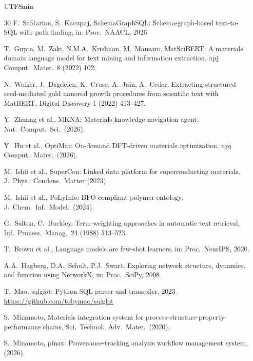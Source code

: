 \documentclass[sn-mathphys,Numbered]{sn-jnl}
\begin{document}
\begin{CJK}{UTF8}{min}
\begin{thebibliography}{30}
F.~Safdarian, S.~Kacupaj,
SchemaGraphSQL: Schema-graph-based text-to-SQL with path finding,
in: Proc.\ NAACL, 2026.

T.~Gupta, M.~Zaki, N.M.A.~Krishnan, M.~Mausam,
MatSciBERT: A materials domain language model for text mining and information extraction,
npj Comput.\ Mater.\ 8 (2022) 102.

N.~Walker, J.~Dagdelen, K.~Cruse, A.~Jain, A.~Ceder,
Extracting structured seed-mediated gold nanorod growth procedures from scientific text with MatBERT,
Digital Discovery 1 (2022) 413--427.

Y.~Zhuang et al.,
MKNA: Materials knowledge navigation agent,
Nat.\ Comput.\ Sci.\ (2026).

Y.~Hu et al.,
OptiMat: On-demand DFT-driven materials optimization,
npj Comput.\ Mater.\ (2026).

M.~Ishii et al.,
SuperCon: Linked data platform for superconducting materials,
J.\ Phys.: Condens.\ Matter (2023).

M.~Ishii et al.,
PoLyInfo: BFO-compliant polymer ontology,
J.\ Chem.\ Inf.\ Model.\ (2024).

G.~Salton, C.~Buckley,
Term-weighting approaches in automatic text retrieval,
Inf.\ Process.\ Manag.\ 24 (1988) 513--523.

T.~Brown et al.,
Language models are few-shot learners,
in: Proc.\ NeurIPS, 2020.

A.A.~Hagberg, D.A.~Schult, P.J.~Swart,
Exploring network structure, dynamics, and function using {NetworkX},
in: Proc.\ SciPy, 2008.

T.~Mao,
sqlglot: Python SQL parser and transpiler, 2023.
\url{https://github.com/tobymao/sqlglot}

S.~Minamoto,
Materials integration system for process-structure-property-performance chains,
Sci.\ Technol.\ Adv.\ Mater.\ (2020).

S.~Minamoto,
pinax: Provenance-tracking analysis workflow management system,
(2026).

\end{thebibliography}

\clearpage
\onecolumn
\appendix
\renewcommand{\thesection}{S\arabic{section}}
\renewcommand{\thetable}{S\arabic{table}}
\renewcommand{\thefigure}{S\arabic{figure}}
\renewcommand{\theequation}{S\arabic{equation}}
\setcounter{section}{0}
\setcounter{table}{0}
\setcounter{figure}{0}
\setcounter{equation}{0}


\end{CJK}
\end{document}
